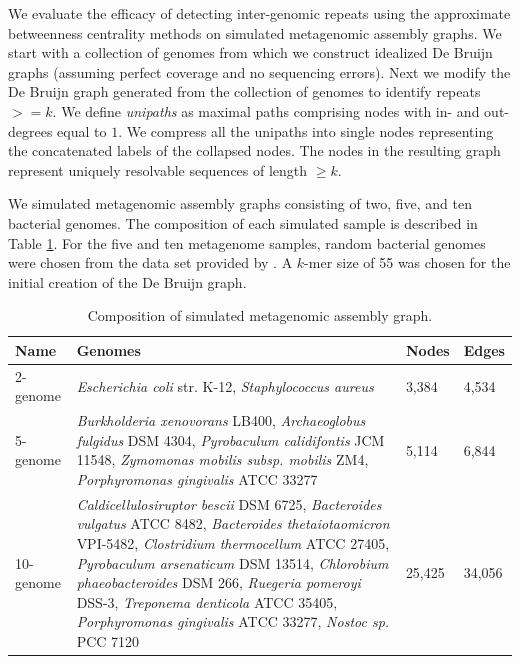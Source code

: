 \documentclass[runningheads,a4paper]{llncs}
\begin{document}
We evaluate the efficacy of detecting inter-genomic repeats using the approximate betweenness centrality methods on simulated metagenomic assembly graphs.
We start with a collection of genomes from which we construct idealized De Bruijn graphs (assuming perfect coverage and no sequencing errors). Next we modify the De Bruijn graph generated from the collection of genomes to identify repeats $>=k$. We define \textit{unipaths} as maximal paths comprising nodes with in- and out-degrees equal to $1$. We compress all the unipaths into single nodes representing the concatenated labels of the collapsed nodes. 
The nodes in the resulting graph represent uniquely resolvable sequences of length $\geq k$.

We simulated metagenomic assembly graphs consisting of two, five, and ten bacterial genomes.
The composition of each simulated sample is described in Table \ref{tab:composition}.
For the five and ten metagenome samples, random bacterial genomes were chosen from the data set provided by \cite{shakya2013comparative}.
A $k$-mer size of 55 was chosen for the initial creation of the De Bruijn graph.

\begin{table}[h]
\centering
\caption[]{Composition of simulated metagenomic assembly graph.}
\begin{tabularx}{\linewidth}{|l|X|l|l|}
\hline
\textbf{Name} & \textbf{Genomes} & \textbf{Nodes} & \textbf{Edges} \\
\hline
2-genome & \textit{Escherichia coli} str. K-12, \textit{Staphylococcus aureus}  & 3,384 & 4,534 \\
\hline
5-genome & \textit{Burkholderia xenovorans} LB400, \textit{Archaeoglobus fulgidus} DSM 4304,  \textit{Pyrobaculum calidifontis} JCM 11548, \textit{Zymomonas mobilis subsp. mobilis} ZM4, \textit{Porphyromonas gingivalis} ATCC 33277 & 5,114 & 6,844  \\
\hline
10-genome  & \textit{Caldicellulosiruptor bescii} DSM 6725, \textit{Bacteroides vulgatus} ATCC 8482,
\textit{Bacteroides thetaiotaomicron} VPI-5482, \textit{Clostridium thermocellum} ATCC 27405,
\textit{Pyrobaculum arsenaticum} DSM 13514, \textit{Chlorobium phaeobacteroides} DSM 266,
\textit{Ruegeria pomeroyi} DSS-3, \textit{Treponema denticola} ATCC 35405,
\textit{Porphyromonas gingivalis} ATCC 33277, \textit{Nostoc sp.} PCC 7120  & 25,425 & 34,056\\
\hline
\end{tabularx}
\label{tab:composition}
\end{table}
\end{document}
